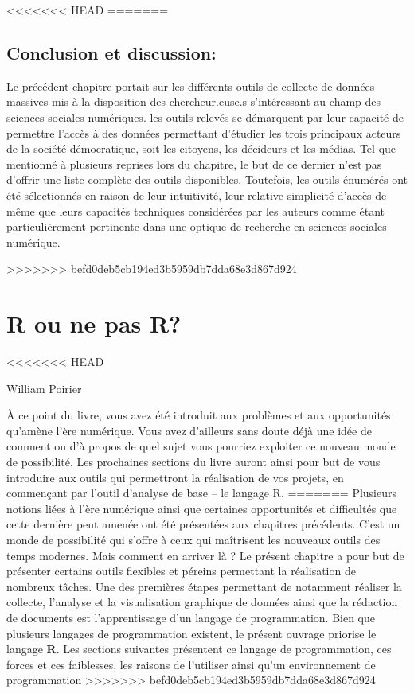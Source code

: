 \documentclass[
  letterpaper,
]{scrbook}
\begin{document}
<<<<<<< HEAD
=======
\hypertarget{conclusion-et-discussion}{%
\section{Conclusion et discussion:}\label{conclusion-et-discussion}}

Le précédent chapitre portait sur les différents outils de collecte de
données massives mis à la disposition des chercheur.euse.s s'intéressant
au champ des sciences sociales numériques. les outils relevés se
démarquent par leur capacité de permettre l'accès à des données
permettant d'étudier les trois principaux acteurs de la société
démocratique, soit les citoyens, les décideurs et les médias. Tel que
mentionné à plusieurs reprises lors du chapitre, le but de ce dernier
n'est pas d'offrir une liste complète des outils disponibles. Toutefois,
les outils énumérés ont été sélectionnés en raison de leur intuitivité,
leur relative simplicité d'accès de même que leurs capacités techniques
considérées par les auteurs comme étant particulièrement pertinente dans
une optique de recherche en sciences sociales numérique.

>>>>>>> befd0deb5cb194ed3b5959db7dda68e3d867d924

\hypertarget{r-ou-ne-pas-r}{%
\chapter{R ou ne pas R?}\label{r-ou-ne-pas-r}}

<<<<<<< HEAD
\begin{flushright}
William Poirier
\end{flushright}

À ce point du livre, vous avez été introduit aux problèmes et aux
opportunités qu'amène l'ère numérique. Vous avez d'ailleurs sans doute
déjà une idée de comment ou d'à propos de quel sujet vous pourriez
exploiter ce nouveau monde de possibilité. Les prochaines sections du
livre auront ainsi pour but de vous introduire aux outils qui
permettront la réalisation de vos projets, en commençant par l'outil
d'analyse de base -- le langage R.
=======
Plusieurs notions liées à l'ère numérique ainsi que certaines
opportunités et difficultés que cette dernière peut amenée ont été
présentées aux chapitres précédents. C'est un monde de possibilité qui
s'offre à ceux qui maîtrisent les nouveaux outils des temps modernes.
Mais comment en arriver là ? Le présent chapitre a pour but de présenter
certains outils flexibles et péreins permettant la réalisation de
nombreux tâches. Une des premières étapes permettant de notamment
réaliser la collecte, l'analyse et la visualisation graphique de données
ainsi que la rédaction de documents est l'apprentissage d'un langage de
programmation. Bien que plusieurs langages de programmation existent, le
présent ouvrage priorise le langage \textbf{R}. Les sections suivantes
présentent ce langage de programmation, ces forces et ces faiblesses,
les raisons de l'utiliser ainsi qu'un environnement de programmation
>>>>>>> befd0deb5cb194ed3b5959db7dda68e3d867d924
\end{document}
